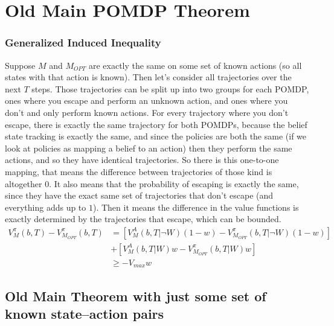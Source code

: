\documentclass[10pt,english]{article}
\begin{document}
\section{Old Main POMDP Theorem}

\subsubsection{Generalized Induced Inequality}
Suppose $M$ and $M_{OPT}$ are exactly the same on some set of known actions (so all states with that action is known). Then let's consider all trajectories over the next $T$ steps. Those trajectories can be split up into two groups for each POMDP, ones where you escape and perform an unknown action, and ones where you don't and only perform known actions. For every trajectory where you don't escape, there is exactly the same trajectory for both POMDPs, because the belief state tracking is exactly the same, and since the policies are both the same (if we look at policies as mapping a belief to an action) then they perform the same actions, and so they have identical trajectories. So there is this one-to-one mapping, that means the difference between trajectories of those kind is altogether $0$. It also means that the probability of escaping is exactly the same, since they have the exact same set of trajectories that don't escape (and everything adds up to $1$). Then it means the difference in the value functions is exactly determined by the trajectories that escape, which can be bounded.
\begin{align}
V^{\pi}_M(b,T) - V^{\pi}_{M_{OPT}}(b,T) &= [V^A_M(b,T|\neg W)(1-w) - V^{\pi}_{M_{OPT}}(b,T|\neg W)(1-w)] \\
& + [V^A_M(b,T|W)w - V^{\pi}_{M_{OPT}}(b,T|W)w]\\
&\geq -V_{max}w
\end{align}

\subsection{Old Main Theorem with just some set of known state--action pairs}
\end{document}
